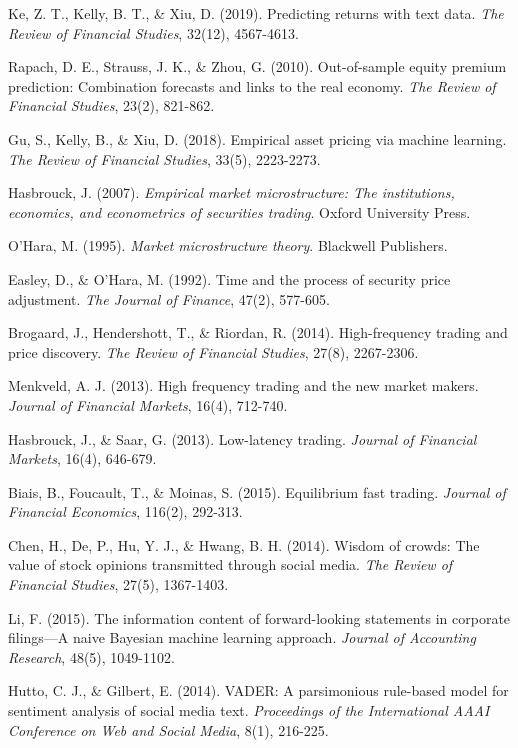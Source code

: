 \documentclass[12pt,a4paper]{article}
\begin{document}
\begin{thebibliography}{99}
Ke, Z. T., Kelly, B. T., \& Xiu, D. (2019). Predicting returns with text data. \textit{The Review of Financial Studies}, 32(12), 4567-4613.

Rapach, D. E., Strauss, J. K., \& Zhou, G. (2010). Out-of-sample equity premium prediction: Combination forecasts and links to the real economy. \textit{The Review of Financial Studies}, 23(2), 821-862.

Gu, S., Kelly, B., \& Xiu, D. (2018). Empirical asset pricing via machine learning. \textit{The Review of Financial Studies}, 33(5), 2223-2273.

Hasbrouck, J. (2007). \textit{Empirical market microstructure: The institutions, economics, and econometrics of securities trading}. Oxford University Press.

O'Hara, M. (1995). \textit{Market microstructure theory}. Blackwell Publishers.

Easley, D., \& O'Hara, M. (1992). Time and the process of security price adjustment. \textit{The Journal of Finance}, 47(2), 577-605.

Brogaard, J., Hendershott, T., \& Riordan, R. (2014). High-frequency trading and price discovery. \textit{The Review of Financial Studies}, 27(8), 2267-2306.

Menkveld, A. J. (2013). High frequency trading and the new market makers. \textit{Journal of Financial Markets}, 16(4), 712-740.

Hasbrouck, J., \& Saar, G. (2013). Low-latency trading. \textit{Journal of Financial Markets}, 16(4), 646-679.

Biais, B., Foucault, T., \& Moinas, S. (2015). Equilibrium fast trading. \textit{Journal of Financial Economics}, 116(2), 292-313.

Chen, H., De, P., Hu, Y. J., \& Hwang, B. H. (2014). Wisdom of crowds: The value of stock opinions transmitted through social media. \textit{The Review of Financial Studies}, 27(5), 1367-1403.

Li, F. (2015). The information content of forward-looking statements in corporate filings—A naive Bayesian machine learning approach. \textit{Journal of Accounting Research}, 48(5), 1049-1102.

Hutto, C. J., \& Gilbert, E. (2014). VADER: A parsimonious rule-based model for sentiment analysis of social media text. \textit{Proceedings of the International AAAI Conference on Web and Social Media}, 8(1), 216-225.

\end{thebibliography}
\end{document}
